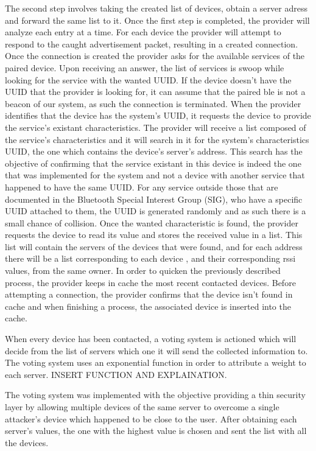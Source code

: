 The second step involves taking the created list of devices, obtain a server adress and forward the same list to it. Once the first step is completed, the provider will analyze each entry at a time. For each device the provider will attempt to respond to the caught advertisement packet, resulting in a created connection.  Once the connection is created the provider asks for the available services of the paired device. Upon receiving an answer, the list of services is swoop while looking for the service with the wanted UUID. If the device doesn't have the UUID that the provider is looking for, it can assume that the paired ble is not a beacon of our system, as such the connection is terminated. When the provider identifies that the device has the system's UUID, it requests the device to provide the service's existant characteristics. The provider will receive a list composed of the service's characteristics and it will search in it for the system's characteristics UUID, the one which contains the device's server's address. This search has the objective of confirming that the service existant in this device is indeed the one that was implemented for the system and not a device with another service that happened to have the same UUID. For any service outside those that are documented in the Bluetooth Special Interest Group (SIG), who have a specific UUID attached to them, the UUID is generated randomly and as such there is a small chance of collision. Once the wanted characteristic is found, the provider requests the device to read its value and stores the received value in a list. This list will contain the servers of the devices that were found, and for each address there will be a list corresponding to each device , and their corresponding rssi values, from the same owner. In order to quicken the previously described process, the provider keeps in cache the most recent contacted devices. Before attempting a connection, the provider confirms that the device isn't found in cache and when finishing a process, the associated device is inserted into the cache.

When every device has been contacted, a voting system is actioned which will decide from the list of servers which one it will send the collected information to. The voting system uses an exponential function in order to attribute a weight to each server. INSERT FUNCTION AND EXPLAINATION.

The voting system was implemented with the objective providing a thin security layer by allowing multiple devices of the same server to overcome a single attacker's device which happened to be close to the user. After obtaining each server's values, the one with the highest value is chosen and sent the list with all the devices. 

